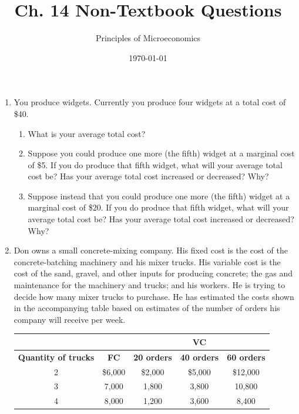 \documentclass{article}
\title{Ch. 14 Non-Textbook Questions}
\author{Principles of Microeconomics}
\date{\today}
\begin{document}
\maketitle

\begin{enumerate}

\item You produce widgets. Currently you produce four widgets at a total cost of \$40.

	\begin{enumerate}
	
	\item What is your average total cost?
	
	\item Suppose you could produce one more (the fifth) widget at a marginal cost of \$5. If you do produce that fifth widget, what will your average total cost be? Has your average total cost increased or decreased? Why?
	
	\item Suppose instead that you could produce one more (the fifth) widget at a marginal cost of \$20. If you do produce that fifth widget, what will your average total cost be? Has your average total cost increased or decreased? Why?
	
	\end{enumerate}
	
\item Don owns a small concrete-mixing company. His fixed cost is the cost of the concrete-batching machinery and his mixer trucks. His variable cost is the cost of the sand, gravel, and other inputs for producing concrete; the gas and maintenance for the machinery and trucks; and his workers. He is trying to decide how many mixer trucks to purchase. He has estimated the costs shown in the accompanying table based on estimates of the number of orders his company will receive per week.
	\begin{center}
	\begin{tabular}{ c | c | c | c | c }
	& & \multicolumn{3}{c}{\textbf{VC}} \\
	\hline
	\textbf{Quantity of trucks} & \textbf{FC} & \textbf{20 orders} & \textbf{40 orders} & \textbf{60 orders} \\
	\hline
	2 & \$6,000 & \$2,000 & \$5,000 & \$12,000 \\
	\hline
	3 & 7,000 & 1,800 & 3,800 & 10,800 \\
	\hline
	4 & 8,000 & 1,200 & 3,600 & 8,400
	\end{tabular}
	\end{center}
	\begin{enumerate}
	

\end{enumerate}
\end{enumerate}
\end{document}

